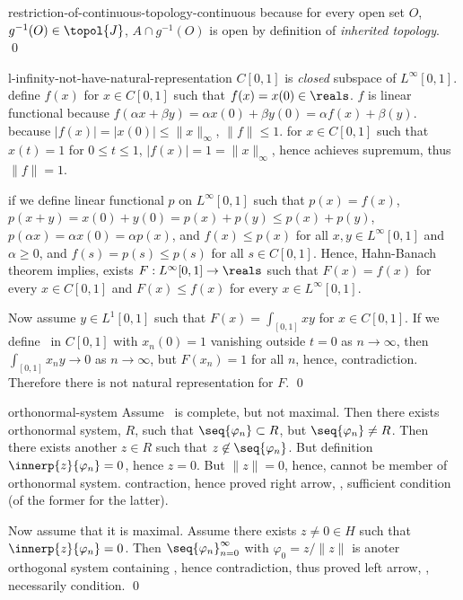 \documentclass[17pt,landscape]{foils}
\newcommand{\tJ}{\topol{J}}
\begin{document}
{{{\begin{myproof}{restriction-of-continuous-topology-continuous}
	because for every open set $O$, $g^{-1}(O) \in \tJ$,
	$A\cap g^{-1}(O)$ is open by definition of \emph{inherited topology}.
	\qed\
\end{myproof}

\begin{myproof}{l-infinity-not-have-natural-representation}
	$C[0,1]$ is \emph{closed} subspace of $L^\infty[0,1]$.
	define $f(x)$ for $x\in C[0,1]$
	such that $f(x) = x(0)\in\reals$.
	$f$ is linear functional because $f(\alpha x+\beta y) = \alpha x(0) + \beta y(0) = \alpha f(x) + \beta (y)$.
	because $|f(x)| = |x(0)| \leq \|x\|_\infty$, $\|f\|\leq 1$.
	for
	$x\in C[0,1]$ such that $x(t)=1$ for $0\leq t\leq 1$, $|f(x)| = 1 = \|x\|_\infty$, hence achieves supremum,
	thus $\|f\|=1$.

	if we define linear functional $p$ on $L^\infty[0,1]$ such that $p(x) = f(x)$, %
	$p(x+y) = x(0)+y(0)=p(x)+p(y)\leq p(x)+p(y)$, $p(\alpha x)=\alpha x(0) = \alpha p(x)$, and $f(x)\leq p(x)$
	for all $x,y\in L^\infty[0,1]$ and $\alpha \geq0$,
	and $f(s)=p(s)\leq p(s)$ for all $s\in C[0,1]$. Hence, Hahn-Banach theorem implies,
	exists $F:L^\infty[0,1]\to\reals$ such that $F(x)=f(x)$ for every $x\in C[0,1]$
	and $F(x)\leq f(x)$ for every $x\in L^\infty[0,1]$.

	Now assume $y\in L^1[0,1]$ such that $F(x)=\int_{[0,1]} xy$ for $x\in C[0,1]$.
	If we define \seq{x_n}\ in $C[0,1]$
	with $x_n(0)=1$ vanishing outside $t=0$ as $n\to \infty$,
	then
	$\int_{[0,1]} x_n y \to 0$ as $n\to\infty$, but $F(x_n)=1$ for all $n$,
	hence, contradiction.
	Therefore there is not natural representation for $F$.
	\qed\
\end{myproof}

\begin{myproof}{orthonormal-system}
	Assume \ is complete, but not maximal.
	Then there exists orthonormal system, $R$, such that $\seq{\varphi_n}\subset R$, but $\seq{\varphi_n}\neq R$.
	Then there exists another $z\in R$ such that $z\not\in\seq{\varphi_n}$.
	But definition $\innerp{z}{\varphi_n}=0$, hence $z=0$.
	But $\|z\|=0$, hence, cannot be member of orthonormal system. contraction,
	hence proved right arrow,
	\ie, sufficient condition (of the former for the latter).

	Now assume that it is maximal.
	Assume there exists $z\neq0\in H$ such that $\innerp{z}{\varphi_n}=0$.
	Then $_{n=0}^\infty$ with $\varphi_0=z/\|z\|$
	is anoter orthogonal system containing \seq{\varphi_n},
	hence contradiction, thus
	proved left arrow,
	\ie, necessarily condition.
	\qed\
\end{myproof}
}{}

}}
\end{document}
